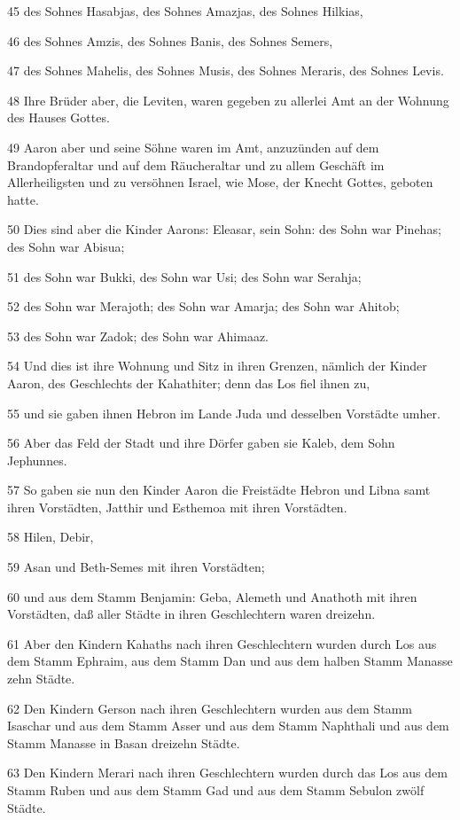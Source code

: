 \par 45 des Sohnes Hasabjas, des Sohnes Amazjas, des Sohnes Hilkias,
\par 46 des Sohnes Amzis, des Sohnes Banis, des Sohnes Semers,
\par 47 des Sohnes Mahelis, des Sohnes Musis, des Sohnes Meraris, des Sohnes Levis.
\par 48 Ihre Brüder aber, die Leviten, waren gegeben zu allerlei Amt an der Wohnung des Hauses Gottes.
\par 49 Aaron aber und seine Söhne waren im Amt, anzuzünden auf dem Brandopferaltar und auf dem Räucheraltar und zu allem Geschäft im Allerheiligsten und zu versöhnen Israel, wie Mose, der Knecht Gottes, geboten hatte.
\par 50 Dies sind aber die Kinder Aarons: Eleasar, sein Sohn: des Sohn war Pinehas; des Sohn war Abisua;
\par 51 des Sohn war Bukki, des Sohn war Usi; des Sohn war Serahja;
\par 52 des Sohn war Merajoth; des Sohn war Amarja; des Sohn war Ahitob;
\par 53 des Sohn war Zadok; des Sohn war Ahimaaz.
\par 54 Und dies ist ihre Wohnung und Sitz in ihren Grenzen, nämlich der Kinder Aaron, des Geschlechts der Kahathiter; denn das Los fiel ihnen zu,
\par 55 und sie gaben ihnen Hebron im Lande Juda und desselben Vorstädte umher.
\par 56 Aber das Feld der Stadt und ihre Dörfer gaben sie Kaleb, dem Sohn Jephunnes.
\par 57 So gaben sie nun den Kinder Aaron die Freistädte Hebron und Libna samt ihren Vorstädten, Jatthir und Esthemoa mit ihren Vorstädten.
\par 58 Hilen, Debir,
\par 59 Asan und Beth-Semes mit ihren Vorstädten;
\par 60 und aus dem Stamm Benjamin: Geba, Alemeth und Anathoth mit ihren Vorstädten, daß aller Städte in ihren Geschlechtern waren dreizehn.
\par 61 Aber den Kindern Kahaths nach ihren Geschlechtern wurden durch Los aus dem Stamm Ephraim, aus dem Stamm Dan und aus dem halben Stamm Manasse zehn Städte.
\par 62 Den Kindern Gerson nach ihren Geschlechtern wurden aus dem Stamm Isaschar und aus dem Stamm Asser und aus dem Stamm Naphthali und aus dem Stamm Manasse in Basan dreizehn Städte.
\par 63 Den Kindern Merari nach ihren Geschlechtern wurden durch das Los aus dem Stamm Ruben und aus dem Stamm Gad und aus dem Stamm Sebulon zwölf Städte.
